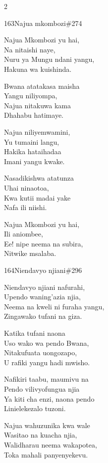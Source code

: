 \begin{multicols}{2}
\begin{hymn}{163}{Najua mkombozi}{\#274}
\begin{stanza}
Najua Mkombozi yu hai,\\
Na nitaishi naye,\\
Nuru ya Mungu ndani yangu,\\
Hakuna wa kuishinda.
\end{stanza}
\begin{chorus}
Bwana atatakasa maisha\\
Yangu niliyompa,\\
Najua nitakuwa kama\\
Dhahabu hatimaye.
\end{chorus}
\begin{stanza}
Najua niliyemwamini,\\
Yu tumaini langu,\\
Hakika hataihadaa\\
Imani yangu kwake.
\end{stanza}
\begin{stanza}
Nasadikishwa atatunza\\
Uhai ninaotoa,\\
Kwa kutii madai yake\\
Nafa ili niishi.
\end{stanza}
\begin{stanza}
Najua Mkombozi yu hai,\\
Ili aniombee,\\
Ee! nipe neema na subira,\\
Nitwike msalaba.
\end{stanza}
\end{hymn}

\begin{hymn}{164}{Niendavyo njiani}{\#296}
\begin{stanza}
Niendavyo njiani nafurahi,\\
Upendo waning'azia njia,\\
Neema na kweli ni furaha yangu,\\
Zingawako tufani na giza.
\end{stanza}
\begin{chorus}
Katika tufani naona\\
Uso wako wa pendo Bwana,\\
Nitakufuata uongozapo,\\
U rafiki yangu hadi mwisho.
\end{chorus}
\begin{stanza}
Nafikiri taabu, maumivu na\\
Pendo vilivyofungua njia\\
Ya kiti cha enzi, naona pendo\\
Linielekezalo tuzoni.
\end{stanza}
\begin{stanza}
Najua wahuzunika kwa wale\\
Wasitao na kuacha njia,\\
Walidharau neema wakapotea,\\
Toka mahali panyenyekevu.
\end{stanza}
\end{hymn}


\end{multicols}
